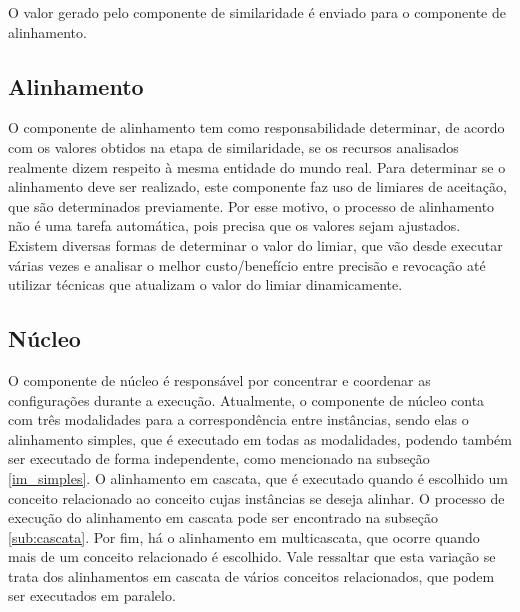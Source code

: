 



O valor gerado pelo componente de similaridade é enviado para o componente de alinhamento.

\subsection{Alinhamento}
O componente de alinhamento tem como responsabilidade determinar, de acordo com os valores obtidos na etapa de similaridade, se os recursos analisados realmente dizem respeito à mesma entidade do mundo real. Para determinar se o alinhamento deve ser realizado, este componente faz uso de limiares de aceitação, que são determinados previamente. Por esse motivo, o processo de alinhamento não é uma tarefa automática, pois precisa que os valores sejam ajustados. Existem diversas formas de determinar o valor do limiar, que vão desde executar várias vezes e analisar o melhor custo/benefício entre precisão e revocação até utilizar técnicas que atualizam o valor do limiar dinamicamente.


\subsection{Núcleo}
O componente de núcleo é responsável por concentrar e coordenar as configurações durante a execução. Atualmente, o componente de núcleo conta com três modalidades para a correspondência entre instâncias, sendo elas o alinhamento simples, que é executado em todas as modalidades, podendo também ser executado de forma independente, como mencionado na subseção \ref{im_simples}. O alinhamento em cascata, que é executado quando é escolhido um conceito relacionado ao conceito cujas instâncias se deseja alinhar. O processo de execução do alinhamento em cascata pode ser encontrado na subseção \ref{sub:cascata}. Por fim, há o alinhamento em multicascata, que ocorre quando mais de um conceito relacionado é escolhido. Vale ressaltar que esta variação se trata dos alinhamentos em cascata de vários conceitos relacionados, que podem ser executados em paralelo.


